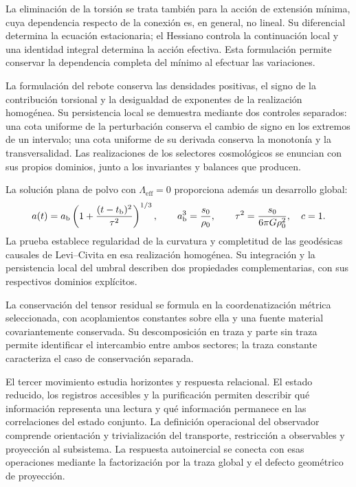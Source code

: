 La eliminación de la torsión se trata también para la acción de
extensión mínima, cuya dependencia respecto de la conexión es, en
general, no lineal. Su diferencial determina la ecuación estacionaria;
el Hessiano controla la continuación local y una identidad integral
determina la acción efectiva. Esta formulación permite conservar la
dependencia completa del mínimo al efectuar las variaciones.

La formulación del rebote conserva las densidades positivas, el signo de
la contribución torsional y la desigualdad de exponentes de la realización
homogénea. Su persistencia local se demuestra mediante dos controles
separados: una cota uniforme de la perturbación conserva el cambio de
signo en los extremos de un intervalo; una cota uniforme de su derivada
conserva la monotonía y la transversalidad. Las realizaciones de los
selectores cosmológicos se enuncian con sus propios dominios, junto a los
invariantes y balances que producen.

La solución plana de polvo con \(\Lambda_{\mathrm{eff}}=0\)
proporciona además un desarrollo global:
\[
 a(t)=a_{\rm b}\left(1+
       \frac{(t-t_{\rm b})^2}{\tau^2}\right)^{1/3},
 \qquad
 a_{\rm b}^3=\frac{s_0}{\rho_0},\qquad
 \tau^2=\frac{s_0}{6\pi G\rho_0^2},
 \quad c=1.
\]
La prueba establece regularidad de la curvatura y completitud de las
geodésicas causales de Levi--Civita en esa realización homogénea.
Su integración y la persistencia local
del umbral describen dos propiedades complementarias, con sus
respectivos dominios explícitos.

La conservación del tensor residual se formula en la coordenatización métrica
seleccionada, con acoplamientos constantes sobre ella y una fuente
material covariantemente conservada. Su descomposición en traza y parte
sin traza permite identificar el intercambio entre ambos sectores;
la traza constante caracteriza el caso de conservación separada.

El tercer movimiento estudia horizontes y respuesta relacional. El estado
reducido, los registros accesibles y la purificación permiten describir
qué información representa una lectura y qué información permanece en las
correlaciones del estado conjunto. La definición operacional del
observador comprende orientación y trivialización del transporte,
restricción a observables y proyección al subsistema. La respuesta
autoinercial se conecta con esas operaciones mediante la factorización
por la traza global y el defecto geométrico de proyección.


